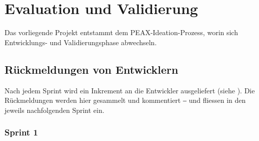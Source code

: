 \section{Evaluation und Validierung}

Das vorliegende Projekt entstammt dem PEAX-Ideation-Prozess, worin sich Entwicklungs- und Validierungsphase abwechseln. 

\subsection{Rückmeldungen von Entwicklern}

Nach jedem Sprint wird ein Inkrement an die Entwickler ausgeliefert (siehe ). Die Rückmeldungen werden hier gesammelt und kommentiert ‒ und fliessen in den jeweils nachfolgenden Sprint ein.

\subsubsection{Sprint 1}

